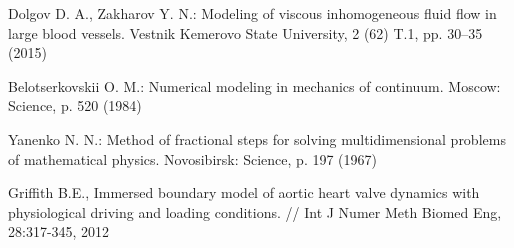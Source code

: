 \documentclass[conference]{IEEEtran}
\begin{document}
\begin{thebibliography}{1}
 Dolgov D. A., Zakharov Y. N.: Modeling of viscous inhomogeneous fluid flow in large blood vessels. Vestnik Kemerovo State University, 2 (62) T.1, pp. 30--35 (2015)

 Belotserkovskii O. M.: Numerical modeling in mechanics of continuum. Moscow: Science, p. 520 (1984)

 Yanenko N. N.: Method of fractional steps for solving multidimensional problems of mathematical physics. Novosibirsk: Science, p. 197 (1967)

 Griffith B.E., Immersed boundary model of aortic heart valve dynamics with 
physiological driving and loading conditions. // Int J Numer Meth Biomed Eng, 
28:317-345, 2012 

\end{thebibliography}




\end{document}
